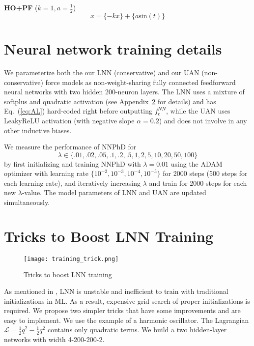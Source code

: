 \documentclass[aps,pre,reprint,superscriptaddress,nofootinbib,amsmath,amssymb]{revtex4-2}
\newcommand{\lag}{\mathcal{L}}
\def\beq#1{\begin{equation}\label{#1}}
\def\eeq{\end{equation}}
\begin{document}
{\bf HO+PF} ($k=1,a=\frac{1}{2}$)
\begin{equation}
	\ddot{x} = \{-kx\}+\{a \mathrm{sin}(t)\}
\end{equation}


\section{Neural network training details}\label{app:training_details}

We parameterize both the our LNN (conservative) and our UAN (non-conservative) force models as non-weight-sharing fully connected feedforward neural networks with two hidden 200-neuron layers. The LNN uses a mixture of softplus and quadratic activation (see Appendix~\ref{app:training_trick} for details) and has Eq.~(\ref{eq:AL}) hard-coded right before outputting $f_{\mathrm{c}}^{NN}$, while the UAN uses LeakyReLU activation (with negative slope $\alpha=0.2$) and does not involve in any other inductive biases. 

We measure the performance of NNPhD for
\beq{lambdaEq}
\lambda\in\{.01,.02,.05,.1,.2,.5,1,2,5,10,20,50,100\}
\eeq
by first initializing and training NNPhD with $\lambda=0.01$ using the ADAM optimizer with 
learning rate $\{10^{-2},10^{-3},10^{-4},10^{-5}\}$ for 2000 steps (500 steps for each learning rate), and iteratively increasing $\lambda$ and train for 2000 steps for each new $\lambda$-value. 
The model parameters of LNN and UAN are updated simultaneously.

\section{Tricks to Boost LNN Training}\label{app:training_trick}

\begin{figure}
	\centering
	\texttt{[image: training\_trick.png]}
	\caption{Tricks to boost LNN training}
	\label{fig:training_trick}
\end{figure}


As mentioned in \cite{cranmer2020lagrangian}, LNN is unstable and inefficient to train with traditional initializations in ML. As a result, expensive grid search of proper initializations is required. We propose two simpler tricks that have some improvements and are easy to implement. We use the example of a harmonic oscillator. The Lagrangian $\lag=\frac{1}{2}\dot{q}^2-\frac{1}{2}q^2$ contains only quadratic terms. We build a two hidden-layer networks with width 4-200-200-2.
\end{document}
